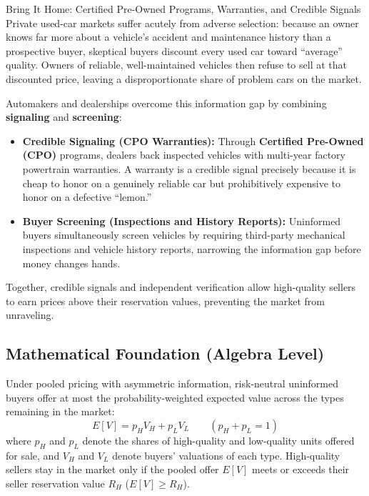 \documentclass[11pt,letterpaper]{article}
\begin{document}
\begin{examplecase}{Bring It Home: Certified Pre-Owned Programs, Warranties, and Credible Signals}
Private used-car markets suffer acutely from adverse selection: because an owner knows far more about a vehicle's accident and maintenance history than a prospective buyer, skeptical buyers discount every used car toward ``average'' quality. Owners of reliable, well-maintained vehicles then refuse to sell at that discounted price, leaving a disproportionate share of problem cars on the market.

Automakers and dealerships overcome this information gap by combining \textbf{signaling} and \textbf{screening}:
\begin{itemize}
    \item \textbf{Credible Signaling (CPO Warranties):} Through \textbf{Certified Pre-Owned (CPO)} programs, dealers back inspected vehicles with multi-year factory powertrain warranties. A warranty is a credible signal precisely because it is cheap to honor on a genuinely reliable car but prohibitively expensive to honor on a defective ``lemon.''
    \item \textbf{Buyer Screening (Inspections and History Reports):} Uninformed buyers simultaneously screen vehicles by requiring third-party mechanical inspections and vehicle history reports, narrowing the information gap before money changes hands.
\end{itemize}
Together, credible signals and independent verification allow high-quality sellers to earn prices above their reservation values, preventing the market from unraveling.
\end{examplecase}

\subsection*{Mathematical Foundation (Algebra Level)}
Under pooled pricing with asymmetric information, risk-neutral uninformed buyers offer at most the probability-weighted expected value across the types remaining in the market:
\begin{equation}
E[V] = p_H V_H + p_L V_L \qquad (p_H + p_L = 1)
\end{equation}
where $p_H$ and $p_L$ denote the shares of high-quality and low-quality units offered for sale, and $V_H$ and $V_L$ denote buyers' valuations of each type. High-quality sellers stay in the market only if the pooled offer $E[V]$ meets or exceeds their seller reservation value $R_H$ ($E[V] \ge R_H$).
\end{document}
